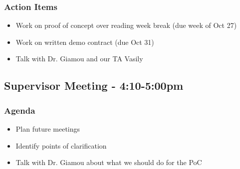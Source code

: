 		\subsubsection*{Action Items}
			\begin{itemize}
				\item Work on proof of concept over reading week break (due week of Oct 27)
				\item Work on written demo contract (due Oct 31)
				\item Talk with Dr. Giamou and our TA Vasily
			\end{itemize}

	\subsection*{Supervisor Meeting - 4:10-5:00pm}
		\subsubsection*{Agenda}
			\begin{itemize}
				\item Plan future meetings
				\item Identify points of clarification
				\item Talk with Dr. Giamou about what we should do for the PoC
			\end{itemize}

